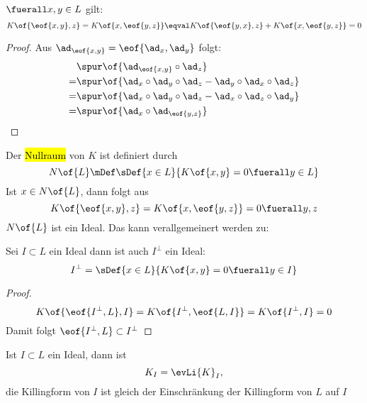 \begin{proposition}
	$\fuerall x,y \in L$ gilt:
	\begin{equation}
		K\of{\eof{x,y},z} = K\of{x,\eof{y,z}} \eqval K\of{\eof{y,x},z} + K\of{x,\eof{y,z}} = 0
	\end{equation}
\end{proposition}
\begin{proof}
	Aus $\ad_{\eof{x,y}} = \eof{\ad_x,\ad_y}$ folgt:
	\begin{equation}
		\begin{split}
			& \spur\of{\ad_{\eof{x,y}}\circ\ad_z} \\
			= & \spur\of{\ad_x\circ\ad_y\circ\ad_z - \ad_y\circ\ad_x\circ\ad_z} \\
			= & \spur\of{\ad_x\circ\ad_y\circ\ad_z - \ad_x\circ\ad_z\circ\ad_y}\\
			= & \spur\of{\ad_x\circ\ad_{\eof{y,z}}}
		\end{split}
	\end{equation}
\end{proof}
Der \hl{Nullraum} von $K$ ist definiert durch
\begin{equation}
	N\of{L} \mDef \sDef{x\in L}{K\of{x,y} = 0 \fuerall y \in L}
\end{equation}
Ist $x \in N\of{L}$, dann folgt aus 
\begin{equation}
	K\of{\eof{x,y},z} = K\of{x,\eof{y,z}} = 0 \fuerall y,z
\end{equation}
$N\of{L}$ ist ein Ideal. Das kann verallgemeinert werden zu:
\begin{korollar}
	Sei $I \subset L$ ein Ideal dann ist auch $I^{\perp}$ ein Ideal:
	\begin{equation}
		I^{\perp} = \sDef{x\in L}{K\of{x,y} = 0 \fuerall y \in I}
	\end{equation}
\end{korollar}
\begin{proof}
	\begin{equation}
		K\of{\eof{I^{\perp},L},I} = K\of{I^{\perp},\eof{L,I}} = K\of{I^{\perp},I} = 0
	\end{equation}
	Damit folgt $\eof{I^{\perp},L} \subset I^{\perp}$
\end{proof}
\begin{proposition}
	Ist $I \subset L$ ein Ideal, dann ist
	\begin{equation}
		K_I = \evLi{K}_I,
	\end{equation}
	\dah die Killingform von $I$ ist gleich der Einschränkung der Killingform von $L$ auf $I$
\end{proposition}

